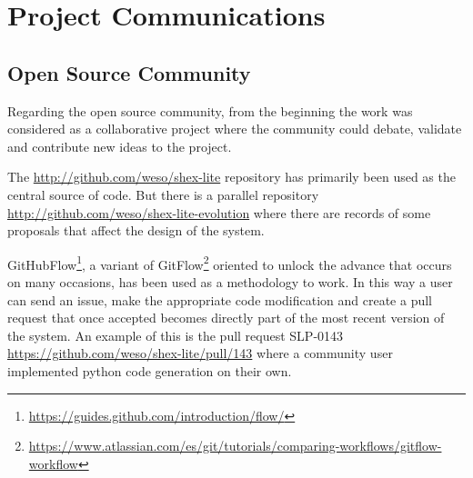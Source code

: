 \chapter{Project Communications}

\section{Open Source Community}
Regarding the open source community, from the beginning the work was considered as a
collaborative project where the community could debate, validate and contribute new
ideas to the project.

The \url{http://github.com/weso/shex-lite} repository has primarily been used as the central source of code. But
there is a parallel repository \url{http://github.com/weso/shex-lite-evolution} where there are records of some proposals that affect
the design of the system.

GitHubFlow\footnote{\url{https://guides.github.com/introduction/flow/}}, a variant of
GitFlow\footnote{\url{https://www.atlassian.com/es/git/tutorials/comparing-workflows/gitflow-workflow}} oriented to unlock the advance that occurs on many
occasions, has been used as a methodology to work. In this way a user can send an issue,
make the appropriate code modification and create a pull request that once accepted becomes
directly part of the most recent version of the system. An example of this is the
pull request SLP-0143 \url{https://github.com/weso/shex-lite/pull/143} where a community user implemented python code generation on
their own.